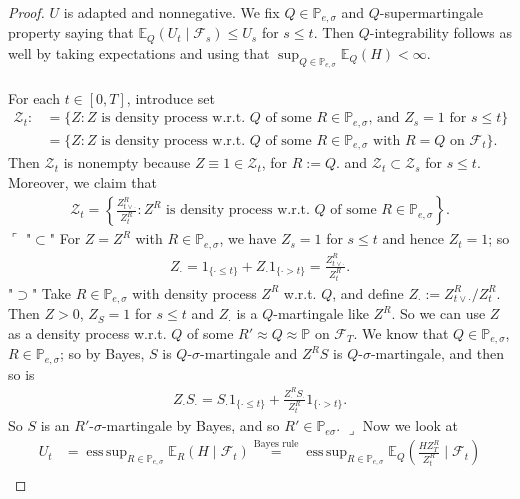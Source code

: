 \documentclass[12pt,a4paper, twoside]{article}
\theoremstyle{definition}
\newcommand{\EE}{\mathbb{E}} %
\newcommand{\PP}{\mathbb{P}} %
\DeclareMathOperator*{\esssup}{ess\,sup}
\begin{document}
\begin{proof}
$U$ is adapted and nonnegative. We fix $Q \in \PP_{e, \sigma}$ and $Q$-supermartingale property saying that $\EE_Q(U_t \mid \mathcal{F}_s) \leq U_s$ for $s \leq t$. Then $Q$-integrability follows as well by taking expectations and using that $\sup_{Q \in \PP_{e, \sigma}} \EE_Q(H) < \infty$. 
\\\\
For each $t \in [0,T]$, introduce set 
\begin{align*}
\mathcal{Z}_t :&= \{ Z : Z \text{ is density process w.r.t. $Q$ of some $R \in \PP_{e, \sigma}$, and $Z_s=1$ for $s \leq t$}\} \\
&= \{ Z : Z \text{ is density process w.r.t. $Q$ of some $R \in \PP_{e, \sigma}$ with $R=Q$ on $\mathcal{F}_t$}\}.
\end{align*}
Then $ \mathcal{Z}_t$ is nonempty because $Z \equiv 1 \in \mathcal{Z}_t$, for $R:= Q$. and $\mathcal{Z}_t \subset \mathcal{Z}_s$ for $s \leq t$. Moreover, we claim that 
\begin{align*}
\mathcal{Z}_t = \left\{ \frac{Z_{t \vee \cdot}^R}{Z_t^R}: Z^R \text{ is density process w.r.t. $Q$ of some $R \in \PP_{e, \sigma}$} \right\}.
\end{align*}
$\ulcorner$ "$\subset$" For $Z=Z^R$ with $R \in \PP_{e, \sigma}$, we have $Z_s=1$ for $s \leq t$ and hence $Z_t=1$; so 
\begin{align*}
Z_\cdot = 1_{\{ \cdot \leq t \}} + Z_\cdot 1_{\{ \cdot > t\}} =  \frac{Z_{t \vee  \cdot}^R}{Z_t^R}. 
\end{align*}
"$\supset$" Take $R \in \PP_{e, \sigma}$ with density process $Z^R$ w.r.t. $Q$, and define $Z_\cdot := Z_{t \vee  \cdot }^R / Z_t^R$. Then $Z >0$, $Z_S=1$ for $s \leq t$ and  $Z_\cdot$ is a $Q$-martingale like $Z^R$. So we can use $Z$ as a density process w.r.t. $Q$ of some $R' \approx Q \approx \PP$ on $\mathcal{F}_T$. We know that $Q \in \PP_{e, \sigma}$, $R \in \PP_{e, \sigma}$; so by Bayes, $S$ is $Q$-$\sigma$-martingale and $Z^RS$ is $Q$-$\sigma$-martingale, and then so is  
\begin{align*}
Z_\cdot S_\cdot = S_\cdot 1_{\{ \cdot \leq t \}} + \frac{Z_\cdot^RS_\cdot}{Z_t^R}1_{\{ \cdot > t\}}.
\end{align*}
So $S$ is an $R'$-$\sigma$-martingale by Bayes, and so $R' \in \PP_{e \sigma}$. \hfill $ \lrcorner$ \newpage 
Now we look at 
\begin{align*}
U_t &= \esssup_{R \in \PP_{e, \sigma}} \EE_R(H \mid \mathcal{F}_t) \overset{\text{Bayes rule}} = \esssup_{R \in \PP_{e, \sigma}} \EE_Q \left( \frac{H Z_T^R}{Z_t^R} \mid \mathcal{F}_t \right)  \\

\end{align*}
\end{proof}
\end{document}
